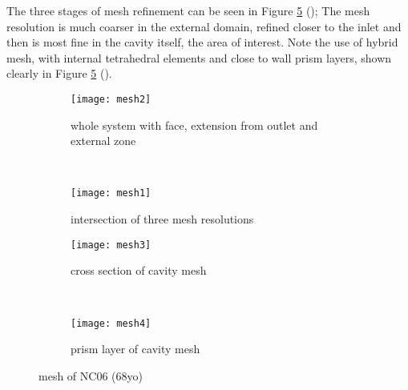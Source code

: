The three stages of mesh refinement can be seen in Figure \ref{fig:cavme} (); The mesh resolution is much coarser in the external domain, refined closer to the inlet and then is most fine in the cavity itself, the area of interest. Note the use of hybrid mesh, with internal tetrahedral elements and close to wall prism layers, shown clearly in Figure \ref{fig:cavme} ().

\begin{figure}
  \begin{subfigure}[t]{0.5\textwidth}
    \texttt{[image: mesh2]}
    \caption{whole system with face, extension from outlet and external zone}
    \label{fig:mesh1}
  \end{subfigure}%
  ~%
  \begin{subfigure}[t]{0.5\textwidth}
    \texttt{[image: mesh1]}
    \caption{intersection of three mesh resolutions}
    \label{fig:mesh2}
  \end{subfigure}

  \begin{subfigure}[t]{0.5\textwidth}
    \texttt{[image: mesh3]}
    \caption{cross section of cavity mesh}
    \label{fig:mesh3}
  \end{subfigure}%
  ~%
  \begin{subfigure}[t]{0.5\textwidth}
    \texttt{[image: mesh4]}
    \caption{prism layer of cavity mesh}
    \label{fig:mesh4}
  \end{subfigure}
  \caption{mesh of NC06 (68yo)} \label{fig:cavme}
\end{figure}
